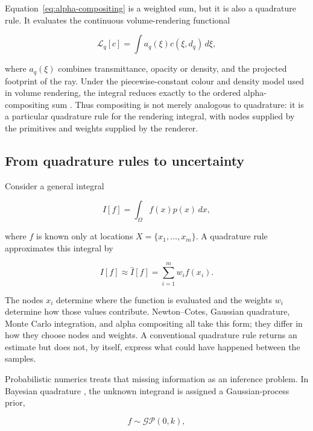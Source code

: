 \documentclass[letterpaper,10pt,conference]{ieeeconf}
\begin{document}
Equation~\eqref{eq:alpha-compositing} is a weighted sum, but it is also a
quadrature rule. It evaluates the continuous volume-rendering functional

\begin{equation}
    \mathcal{L}_q[c]=\int a_q(\xi)c(\xi,d_q)\,d\xi,
    \label{eq:rendering-functional}
\end{equation}

where $a_q(\xi)$ combines transmittance, opacity or density, and the projected
footprint of the ray. Under the piecewise-constant colour and density model
used in volume rendering, the integral reduces exactly to the ordered
alpha-compositing sum \cite{max1995}. Thus compositing is not merely analogous
to quadrature: it is a particular quadrature rule for the rendering integral,
with nodes supplied by the primitives and weights supplied by the renderer.

\subsection{From quadrature rules to uncertainty}

Consider a general integral

\begin{equation}
    I[f]=\int_{\Omega} f(x)p(x)\,dx,
    \label{eq:integral}
\end{equation}

where $f$ is known only at locations $X=\{x_1,\ldots,x_m\}$. A quadrature
rule approximates this integral by

\begin{equation}
    I[f]\approx \widehat I[f]=\sum_{i=1}^{m}w_i f(x_i).
    \label{eq:quadrature}
\end{equation}

The nodes $x_i$ determine where the function is evaluated and the weights
$w_i$ determine how those values contribute. Newton--Cotes, Gaussian
quadrature, Monte Carlo integration, and alpha compositing all take this form;
they differ in how they choose nodes and weights. A conventional quadrature
rule returns an estimate but does not, by itself, express what could have
happened between the samples.

Probabilistic numerics treats that missing information as an inference
problem. In Bayesian quadrature \cite{ohagan1991,briol2019}, the unknown
integrand is assigned a Gaussian-process prior,

\begin{equation}
    f\sim\mathcal{GP}(0,k),
\end{equation}
\end{document}
